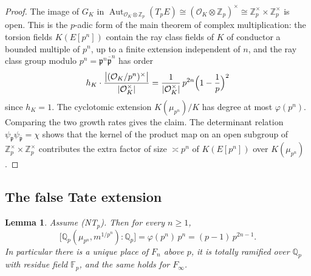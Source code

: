 \documentclass[11pt]{article}
\newtheorem{lemma}[theorem]{Lemma}
\theoremstyle{definition}
\theoremstyle{remark}
\newcommand{\Z}{\mathbb{Z}}
\newcommand{\Q}{\mathbb{Q}}
\newcommand{\F}{\mathbb{F}}
\newcommand{\Aut}{\operatorname{Aut}}
\newcommand{\pp}{\mathfrak{p}}
\newcommand{\ppb}{\overline{\mathfrak{p}}}
\newcommand{\cO}{\mathcal{O}}
\begin{document}
\begin{proof}
The image of \(G_K\) in \(\Aut_{\cO_K\otimes\Z_p}(T_pE)\cong(\cO_K\otimes\Z_p)^\times\cong\Z_p^\times\times\Z_p^\times\) is open. This is the \(p\)-adic form of the main theorem of complex multiplication: the torsion fields \(K(E[p^n])\) contain the ray class fields of \(K\) of conductor a bounded multiple of \(p^n\), up to a finite extension independent of \(n\), and the ray class group modulo \(p^n=\pp^n\ppb^n\) has order
\[
h_K\cdot\frac{\bigl|(\cO_K/p^n)^\times\bigr|}{|\cO_K^\times|}
=
\frac{1}{|\cO_K^\times|}\,p^{2n}\Bigl(1-\frac1p\Bigr)^2
\]
since \(h_K=1\). The cyclotomic extension \(K(\mu_{p^n})/K\) has degree at most \(\varphi(p^n)\). Comparing the two growth rates gives the claim. The determinant relation \(\psi_{\pp}\psi_{\ppb}=\chi\) shows that the kernel of the product map on an open subgroup of \(\Z_p^\times\times\Z_p^\times\) contributes the extra factor of size \(\asymp p^n\) of \(K(E[p^n])\) over \(K(\mu_{p^n})\).
\end{proof}

\subsection{The false Tate extension}
\label{sec:tower}

\begin{lemma}
\label{lem:localdegree}
Assume \textup{(NT\(_p\))}. Then for every \(n\ge 1\),
\[
\bigl[\Q_p(\mu_{p^n},m^{1/p^n}):\Q_p\bigr]
=
\varphi(p^n)\,p^n
=
(p-1)\,p^{2n-1}.
\]
In particular there is a unique place of \(F_n\) above \(p\), it is totally ramified over \(\Q_p\) with residue field \(\F_p\), and the same holds for \(F_\infty\).
\end{lemma}
\end{document}
